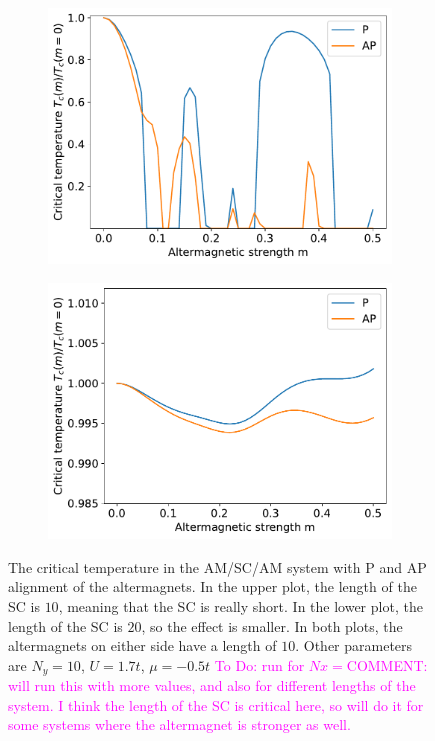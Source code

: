 \documentclass[aps,twocolumn,amsmath,amssymb,preprintnumbers,floatfix,prl,superscriptaddress,longbibliography]{revtex4-2}%
\newcommand{\hans}[1]{\textcolor{Magenta}{{#1}}}
\begin{document}
\begin{figure}
    \centering
    \begin{subfigure}{0.6 \linewidth} \includegraphics[width = \linewidth]{plots_maintext/PAPNx=30.pdf}
    \end{subfigure}
    \begin{subfigure}{0.6 \linewidth} \includegraphics[width = \linewidth]{plots_maintext/PAPNx=40.pdf}
    \end{subfigure}
    \caption{The critical temperature in the AM/SC/AM system with P and AP alignment of the altermagnets. In the upper plot, the length of the SC is $10$, meaning that the SC is really short. In the lower plot, the length of the SC is $20$, so the effect is smaller. In both plots, the altermagnets on either side have a length of $10$. Other parameters are $N_y = 10$, $U = 1.7t$, $\mu = -0.5t$ \hans{To Do: run for $Nx = $}\hans{COMMENT: will run this with more values, and also for different lengths of the system. I think the length of the SC is critical here, so will do it for some systems where the altermagnet is stronger as well.}}
    \label{fig:PAP}
\end{figure}
\end{document}

